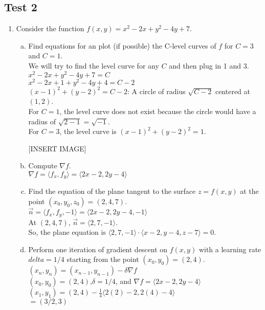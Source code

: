 \subsection{Test 2}
\begin{enumerate}
	\item Consider the function $f(x,y) = x^2-2x+y^2-4y+7$.\\
	\begin{enumerate}[a.]
		\item Find equations for an plot (if possible) the C-level curves of $f$ for $C=3$ and $C=1$.\\
		\indent
		We will try to find the level curve for any $C$ and then plug in 1 and 3.\\
		$x^2-2x+y^2-4y+7=C$\\
		$x^2-2x+1+y^2-4y+4=C-2$\\
		$(x-1)^2+(y-2)^2=C-2$: A circle of radius $\sqrt{C-2}$ centered at $(1,2)$.\\
		For $C=1$, the level curve does not exist because the circle would have a radius of $\sqrt{2-1}=\sqrt{-1}$.\\
		For $C=3$, the level curve is $(x-1)^2+(y-2)^2=1$.
		
		[INSERT IMAGE]
		
		\item Compute $\nabla f$.\\
		\indent
		$\nabla f = \langle f_x, f_y\rangle=\langle 2x-2,2y-4\rangle$\\
		
		\item Find the equation of the plane tangent to the surface $z=f(x,y)$ at the point $(x_0,y_0,z_0)=(2,4,7)$.\\
		\indent
		$\vec{n}=\langle f_x, f_y, -1\rangle=\langle 2x-2, 2y-4, -1\rangle$\\
		At $(2,4,7)$, $\vec{n}=\langle 2,7,-1\rangle$.\\
		So, the plane equation is $\langle 2,7,-1\rangle\cdot\langle x-2, y-4, z-7\rangle=0$.\\
		
		\item Perform one iteration of gradient descent on $f(x,y)$ with a learning rate $delta = 1/4$ starting from the point $(x_0,y_0)=(2,4)$.\\
		\indent
		$(x_n,y_n)=(x_{n-1},y_{n-1})-\delta\nabla f$\\
		$(x_0,y_0)=(2,4)$,$\delta=1/4$, and $\nabla f=\langle 2x-2,2y-4\rangle$\\
		$(x_1,y_1)=(2,4)-\frac{1}{4}\langle 2(2)-2, 2(4)-4\rangle$\\
		$=(3/2, 3)$\\
	\end{enumerate}


\end{enumerate}
